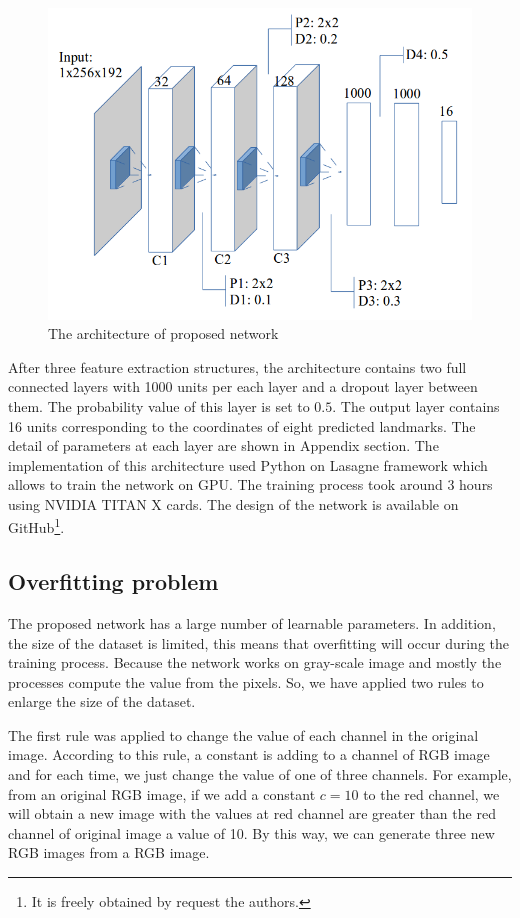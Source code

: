 \documentclass[conference]{IEEEtran}
\begin{document}
\begin{figure}[htbp]
	\centerline{\includegraphics[scale=0.3]{images/architecture}}
	\caption{The architecture of proposed network}
	\label{figarch}
\end{figure}

After three feature extraction structures, the architecture contains two full connected layers with 1000 units per each layer and a dropout layer between them. The probability value of this layer is set to $0.5$. The output layer contains 16 units corresponding to the coordinates of eight predicted landmarks. The detail of parameters at each layer are shown in Appendix section. The implementation of this architecture used Python on Lasagne framework\cite{lasagne} which allows to train the network on GPU. The training process took around 3 hours using NVIDIA TITAN X cards. The design of the network is available on GitHub\footnote{It is freely obtained by request the authors.}.
\subsection{Overfitting problem}
The proposed network has a large number of learnable parameters. In addition, the size of the dataset is limited, this means that overfitting will occur during the training process. Because the network works on  gray-scale image and mostly the processes compute the value from the pixels. So, we have applied two rules to enlarge the size of the dataset.

The first rule was applied to change the value of each channel in the original image. According to this rule, a constant is adding to a channel of RGB image and for each time, we just change the value of one of three channels. For example, from an original RGB image, if we add a constant $c = 10$ to the red channel, we will obtain a new image with the values at red channel are greater than the red channel of original image a value of 10. By this way, we can generate three new RGB images from a RGB image.
\end{document}
